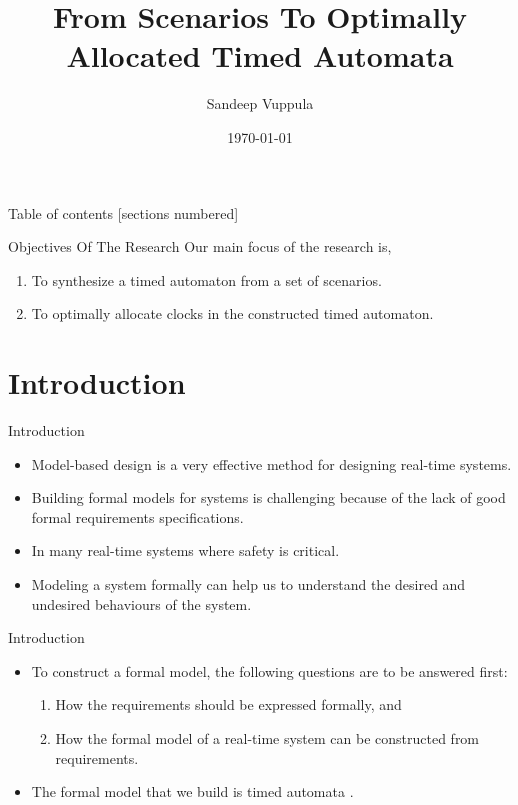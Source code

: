 \documentclass[10pt]{beamer}
\title{From Scenarios To Optimally Allocated Timed Automata}
\date{\today}
\author{Sandeep Vuppula}
\institute{University of Minnesota Duluth}
\theoremstyle{plain}
\theoremstyle{definition}
\begin{document}
\maketitle

\begin{frame}{Table of contents}
  [sections numbered]
  \tableofcontents[hideallsubsections]
\end{frame}

\begin{frame}{Objectives Of The Research}
	Our main focus of the research is,
	\begin{enumerate}
		\item	To synthesize a timed automaton from a set of scenarios.
		\item	To optimally allocate clocks in the constructed timed automaton.
	\end{enumerate}
\end{frame}

\section{Introduction}

\begin{frame}{Introduction}
	\begin{itemize}
		\item Model-based design is a very effective method for designing real-time systems.
		\item Building formal models for systems is challenging because of the lack of good formal requirements specifications.
		\item In many real-time systems where safety is critical.
		\item Modeling a system formally can help us to understand the desired and undesired behaviours of the system.
	\end{itemize}	
\end{frame}

\begin{frame}{Introduction}
	\begin{itemize}
		\item	{To construct a formal model, the following questions are to be answered first:
					\begin{enumerate}
						\item How the requirements should be expressed formally, and
						\item How the formal model of a real-time system can be constructed from requirements.
					\end{enumerate}
				}
			\pause
		\item {The formal model that we build is \alert{timed automata} \cite{Alur:1994:TTA:180782.180519}.}
\end{itemize}
\end{frame}
\end{document}
